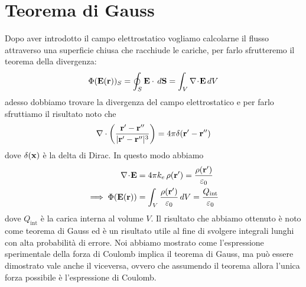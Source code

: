 \section{Teorema di Gauss}
Dopo aver introdotto il campo elettrostatico vogliamo calcolarne il flusso attraverso una superficie chiusa che racchiude le cariche, per farlo sfrutteremo 
il teorema della divergenza:
\begin{align}
  \Phi(\mathbf{E}(\mathbf{r}))_S = \oint_S \mathbf{E} \cdot \,d\mathbf{S} = \int_V \nabla\!\cdot\!\mathbf{ E } \,dV
\end{align}
adesso dobbiamo trovare la divergenza del campo elettrostatico e per farlo sfruttiamo il risultato noto che 
\begin{align}
  \nabla \cdot \left( \frac{\mathbf{r' - r''}}{|\mathbf{r'-r''}|^3} \right) = 4\pi \delta(\mathbf{r' - r''})
\end{align}
dove $ \delta(\mathbf{x}) $ è la delta di Dirac. In questo modo abbiamo
\begin{align}
  \nabla\!\cdot\!\mathbf{ E } &= 4\pi k_e  \, \rho(\mathbf{r'}) = \frac{\rho(\mathbf{r'})}{\varepsilon_0} 
  \\
  \implies \Phi(\mathbf{E(r)}) &= \int_V \frac{\rho(\mathbf{r'})}{\varepsilon_0} \,dV = \frac{Q_{\text{int}}}{\varepsilon_0}
\end{align}
dove $ Q_{\text{int}} $ è la carica interna al volume $ V $. Il risultato che abbiamo ottenuto è noto come teorema di Gauss ed è un risultato utile al 
fine di svolgere integrali lunghi con alta probabilità di errore. Noi abbiamo mostrato come l'espressione sperimentale della forza di Coulomb implica 
il  teorema di Gauss, ma può essere dimostrato vale anche il viceversa, ovvero che assumendo il teorema allora l'unica forza possibile è l'espressione 
di Coulomb.

